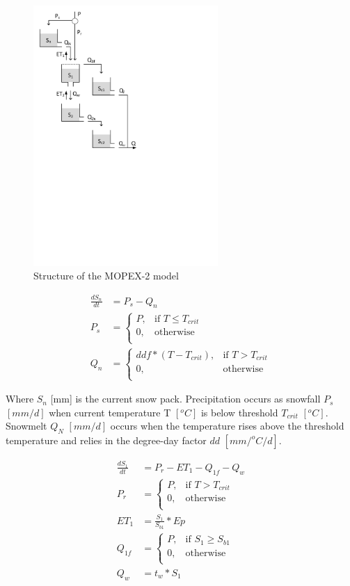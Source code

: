 { 																	%
\begin{figure}
\includegraphics[trim=1cm 13cm 7cm 1cm,width=7cm,keepaspectratio]{./files/30_schematic.pdf}
\caption{Structure of the MOPEX-2 model} \label{fig:30_schematic}
\end{figure}

\begin{align}
	\frac{dS_n}{dt} &= P_s-Q_{n} \\
	P_s &= \begin{cases}
		P, &\text{if } T \leq T_{crit} \\
		0, & \text{otherwise} \\
	\end{cases} \\
	Q_n &=\begin{cases}
		ddf*(T-T_{crit}), &\text{if } T > T_{crit} \\
		0, & \text{otherwise} \\
	\end{cases}
\end{align}

Where $S_n$ [mm] is the current snow pack. Precipitation occurs as snowfall $P_s$ $[mm/d]$ when current temperature T $[^oC]$ is below threshold $T_{crit}$ $[^oC]$. Snowmelt $Q_N$ $[mm/d]$ occurs when the temperature rises above the threshold temperature and relies in the degree-day factor $dd$ $[mm/^oC/d]$.

\begin{align}
	\frac{dS_1}{dt} &= P_r-ET_1-Q_{1f}-Q_w \\
	P_r &= \begin{cases}
		P, &\text{if } T > T_{crit} \\
		0, & \text{otherwise} \\
	\end{cases} \\
	ET_1 &= \frac{S_1}{S_{b1}}*Ep\\
	Q_{1f} &= \begin{cases}
		P, &\text{if } S_1 \geq S_{b1} \\
		0, & \text{otherwise} \\
	\end{cases} \\
	Q_w &= t_w*S_1
\end{align}

}
